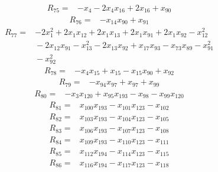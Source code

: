 {\begin{align*}
R_{75} ={}& -x_{4} - 2x_{4} x_{16} + 2x_{16} + x_{90}
\end{align*}
\begin{align*}
R_{76} ={}& -x_{14} x_{90} + x_{91}
\end{align*}
\begin{align*}
R_{77} ={}& -2x_{1}^{2} + 2x_{1} x_{12} + 2x_{1} x_{13} + 2x_{1} x_{91} + 2x_{1} x_{92} - x_{12}^{2} \\
&{}  - 2x_{12} x_{91} - x_{13}^{2} - 2x_{13} x_{92} + x_{17} x_{93} - x_{73} x_{89} - x_{91}^{2} \\
&{}  - x_{92}^{2}
\end{align*}
\begin{align*}
R_{78} ={}& -x_{4} x_{15} + x_{15} - x_{15} x_{90} + x_{92}
\end{align*}
\begin{align*}
R_{79} ={}& -x_{94} x_{97} + x_{97} + x_{99}
\end{align*}
\begin{align*}
R_{80} ={}& -x_{3} x_{120} + x_{95} x_{193} - x_{98} - x_{99} x_{120}
\end{align*}
\begin{align*}
R_{81} ={}& x_{100} x_{193} - x_{101} x_{123} - x_{102}
\end{align*}
\begin{align*}
R_{82} ={}& x_{103} x_{193} - x_{104} x_{123} - x_{105}
\end{align*}
\begin{align*}
R_{83} ={}& x_{106} x_{193} - x_{107} x_{123} - x_{108}
\end{align*}
\begin{align*}
R_{84} ={}& x_{109} x_{193} - x_{110} x_{123} - x_{111}
\end{align*}
\begin{align*}
R_{85} ={}& x_{112} x_{194} - x_{114} x_{123} - x_{115}
\end{align*}
\begin{align*}
R_{86} ={}& x_{116} x_{194} - x_{117} x_{123} - x_{118}
\end{align*}
}
